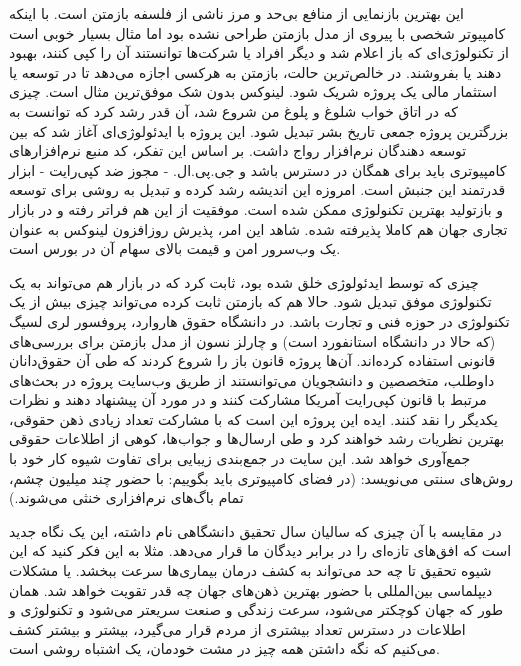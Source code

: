 این بهترین بازنمایی از منافع بی‌حد و مرز ناشی از فلسفه بازمتن است. با
اینکه کامپیوتر شخصی با پیروی از مدل بازمتن طراحی نشده بود اما مثال
بسیار خوبی است از تکنولوژی‌ای که باز اعلام شد و دیگر افراد یا شرکت‌ها
توانستند آن را کپی کنند، بهبود دهند یا بفروشند. در خالص‌ترین حالت،
بازمتن به هرکسی اجازه می‌دهد تا در توسعه یا استثمار مالی یک پروژه شریک
شود. لینوکس بدون شک موفق‌ترین مثال است. چیزی که در اتاق خواب شلوغ و
پلوغ من شروع شد، آن قدر رشد کرد که توانست به بزرگترین پروژه جمعی تاریخ
بشر تبدیل شود. این پروژه با ایدئولوژی‌ای آغاز شد که بین توسعه دهندگان
نرم‌افزار رواج داشت. بر اساس این تفکر، کد منبع نرم‌افزارهای کامپیوتری
باید برای همگان در دسترس باشد و جی.پی.ال. - مجوز ضد کپی‌رایت - ابزار
قدرتمند این جنبش است. امروزه این اندیشه رشد کرده و تبدیل به روشی برای
توسعه و بازتولید بهترین تکنولوژی ممکن شده است. موفقیت از این هم فراتر
رفته و در بازار تجاری جهان هم کاملا پذیرفته شده. شاهد این امر، پذیرش
روزافزون لینوکس به عنوان یک وب‌سرور امن و قیمت بالای سهام آن در بورس
است.

چیزی که توسط ایدئولوژی خلق شده بود، ثابت کرد که در بازار هم می‌تواند به
یک تکنولوژی موفق تبدیل شود. حالا هم که بازمتن ثابت کرده می‌تواند چیزی
بیش از یک تکنولوژی در حوزه فنی و تجارت باشد. در دانشگاه حقوق هاروارد،
پروفسور لری لسیگ (که حالا در دانشگاه استانفورد
است) و چارلز نسون از مدل بازمتن برای
بررسی‌های قانونی استفاده کرده‌اند. آن‌ها پروژه قانون باز را شروع کردند که
طی آن حقوق‌دانان داوطلب، متخصصین و دانشجویان می‌توانستند از طریق وب‌سایت
پروژه در بحث‌های مرتبط با قانون کپی‌رایت آمریکا مشارکت کنند و در مورد آن
پیشنهاد دهند و نظرات یکدیگر را نقد کنند. ایده این پروژه این است که با
مشارکت تعداد زیادی ذهن حقوقی، بهترین نظریات رشد خواهند کرد و طی
ارسال‌ها و جواب‌ها، کوهی از اطلاعات حقوقی جمع‌آوری خواهد شد. این سایت در
جمع‌بندی زیبایی برای تفاوت شیوه کار خود با روش‌های سنتی می‌نویسد:
 (در فضای کامپیوتری باید
بگوییم: با حضور چند میلیون چشم، تمام باگ‌های نرم‌افزاری خنثی می‌شوند.)

در مقایسه با آن چیزی که سالیان سال تحقیق دانشگاهی نام داشته، این یک
نگاه جدید است که افق‌های تازه‌ای را در برابر دیدگان ما قرار می‌دهد. مثلا
به این فکر کنید که این شیوه تحقیق تا چه حد می‌تواند به کشف درمان
بیماری‌ها سرعت ببخشد. یا مشکلات دیپلماسی بین‌المللی با حضور بهترین
ذهن‌های جهان چه قدر تقویت خواهد شد. همان طور که جهان کوچکتر می‌شود، سرعت
زندگی و صنعت سریعتر می‌شود و تکنولوژی و اطلاعات در دسترس تعداد بیشتری
از مردم قرار می‌گیرد، بیشتر و بیشتر کشف می‌کنیم که نگه داشتن همه چیز در
مشت خودمان، یک اشتباه روشی است.

